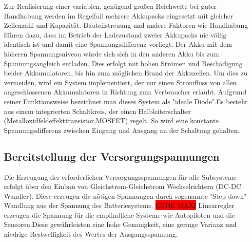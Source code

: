 Zur Realisierung einer variablen, genügend großen Reichweite bei guter Handhabung werden im Regelfall mehrere Akkupacks eingesetzt mit gleicher Zellenzahl und Kapazität.
Bauteilstreuung und andere Faktoren wie Handhabung führen dazu, dass im Betrieb  der Ladezustand zweier Akkupacks nie völlig identisch ist und damit eine Spannungsdifferenz vorliegt. Der Akku mit dem höheren Spannungsniveau würde sich sich in den anderen Akku bis zum Spannungsangleich entladen. Dies erfolgt mit hohen Strömen und Beschädigung beider Akkumulatoren, bis hin zum möglichen Brand der Akkuzellen.
Um dies zu vermeiden, wird ein System implementiert, der nur einen Stromfluss von allen angeschlossenen Akkumulatoren in Richtung zum Verbraucher erlaubt. Aufgrund seiner Funktionsweise bezeichnet man dieses System als "ideale Diode".Es besteht aus einem integrierten Schaltkreis, der einen Halbleiterschalter (Metalloxidfeldeffekttransistor,MOSFET) regelt. So wird eine konstante Spannungsdifferenz zwischen Eingang und Ausgang an der Schaltung gehalten.


\begin{comment}
Zur Realisierung einer variablen großen Reichweite bei guter Handhabung werden im Regelfall mehrere Akkupacks gleicher Zellenzahl und Kapazität eingesetzt.
In der Praxis ist es unvermeidlich, dass der Ladezustand zweier Akkupacks aufgrund von Bauteilstreuung und Handhabung nie identisch ist und damit eine Spannungsdifferenz aufweist. Damit würde der Akku mit dem höheren Spannungsniveau sich über eine niederohmige Verbindung ungebremst in den zweiten Akku bis zum Spannungsangleich entladen. Dies erfolgt mit  hohen Strömen und Beschädigung beider Akkumulatoren bis hin zum möglichen Brand der Akkuzellen.
Um zu vermeiden, dass dieser Ausgleich stattfindet, wird ein System implementiert, welches nur einen Stromfluss von allen angeschlossenen Akkumulatoren in Richtung der Verbraucher ermöglicht.
Dieses System wird aufgrund seiner Funktionsweise als "ideale Diode" bezeichnet. Es besteht aus einem integrierten Schaltkreis welches einen Halbleiterschalter (Metalloxidfeldeffekttransistor kurz MOSFET) regelt um einen konstante Spannungsdifferenz zwischen Eingang und Ausgang dieser Schaltung zu halten.
\end{comment}


\subsection{Bereitstellung der Versorgungspannungen}

Die Erzeugung der erforderlichen Versorgungsspannungen für alle Subsysteme erfolgt über den Einbau von Gleichstrom-Gleichstrom Wechselrichtern (DC-DC Wandler).
Diese erzeugen die nötigen Spannungen durch sogenannte "Step down"  Wandlung aus der Spannung des Batteriesystems. \colorbox{red}{ENDE MAXI}
Linearregler erzeugen die Spannung für die empfindliche Systeme wie Autopiloten und die Sensoren.Diese gewährleisten eine hohe Genauigkeit, eine geringe Varianz und niedrige Restwelligkeit des Wertes der Ausgangsspannung.

